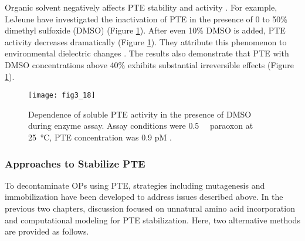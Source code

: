 \begin{refsection}
Organic solvent negatively affects PTE stability and
activity \cite{LeJeune1997a}. For example, LeJeune  have
investigated the inactivation of PTE in the presence of 0 to 50\% dimethyl
sulfoxide (DMSO) \cite{LeJeune1997a} (Figure \ref{fig:pte-organic-inactive}).
After even 10\% DMSO is added, PTE activity decreases dramatically (Figure
\ref{fig:pte-organic-inactive}). They attribute this phenomenon to
environmental dielectric changes \cite{LeJeune1997a}. The results also
demonstrate that PTE with DMSO concentrations above 40\% exhibits substantial
irreversible effects \cite{LeJeune1997a} (Figure
\ref{fig:pte-organic-inactive}).
\begin{figure}[h!] \centering \texttt{[image: fig3\_18]}
    \caption[Dependence of soluble PTE activity in the
    presence of DMSO during enzyme assay. Assay conditions were
\SI{0.5}{\milli\Molar} paraoxon at \SI{25}{\celsius}, PTE concentration was 0.9
pM.]{Dependence of soluble PTE activity in the presence of DMSO during enzyme
    assay. Assay conditions were \SI{0.5}{\milli\Molar} paraoxon at
    \SI{25}{\celsius}, PTE concentration was 0.9 pM \cite{LeJeune1997a}.}
    \label{fig:pte-organic-inactive}
\end{figure}

\subsubsection{Approaches to Stabilize PTE}

To decontaminate OPs using PTE, strategies including mutagenesis and
immobilization have been developed to address issues described above. In the
previous two chapters, discussion focused on unnatural amino acid
incorporation and computational modeling for PTE stabilization. Here, two
alternative methods are provided as follows. 


\end{refsection}
